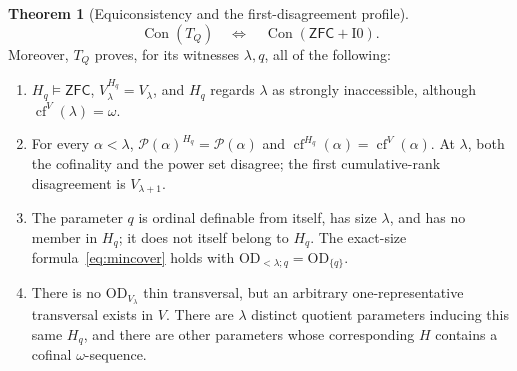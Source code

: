 \documentclass[11pt,letterpaper]{article}
\theoremstyle{definition}
\newtheorem{theorem}[definition]{Theorem}
\numberwithin{equation}{section}
\newcommand{\ZFC}{\mathsf{ZFC}}
\newcommand{\OD}{\mathrm{OD}}
\newcommand{\Con}{\operatorname{Con}}
\newcommand{\cf}{\operatorname{cf}}
\newcommand{\Pow}{\mathcal P}
\newcommand{\Izero}{\mathrm{I0}}
\newcommand{\ODq}{\OD_{<\lambda;q}}
\newcommand{\ODone}[1]{\OD_{\{#1\}}}
\begin{document}
\begin{theorem}[Equiconsistency and the first-disagreement profile]\label{thm:calibration}
\[
\Con(T_Q)\quad\Longleftrightarrow\quad\Con(\ZFC+\Izero).
\]
Moreover, $T_Q$ proves, for its witnesses $\lambda,q$, all of the following:
\begin{enumerate}
\item $H_q\models\ZFC$, $V_\lambda^{H_q}=V_\lambda$, and $H_q$ regards $\lambda$ as strongly inaccessible, although $\cf^V(\lambda)=\omega$.
\item For every $\alpha<\lambda$, $\Pow(\alpha)^{H_q}=\Pow(\alpha)$ and $\cf^{H_q}(\alpha)=\cf^V(\alpha)$. At $\lambda$, both the cofinality and the power set disagree; the first cumulative-rank disagreement is $V_{\lambda+1}$.
\item The parameter $q$ is ordinal definable from itself, has size $\lambda$, and has no member in $H_q$; it does not itself belong to $H_q$. The exact-size formula~\eqref{eq:mincover} holds with $\ODq=\ODone q$.
\item There is no $\OD_{V_\lambda}$ thin transversal, but an arbitrary one-representative transversal exists in $V$. There are $\lambda$ distinct quotient parameters inducing this same $H_q$, and there are other parameters whose corresponding $H$ contains a cofinal $\omega$-sequence.
\end{enumerate}
\end{theorem}
\end{document}
